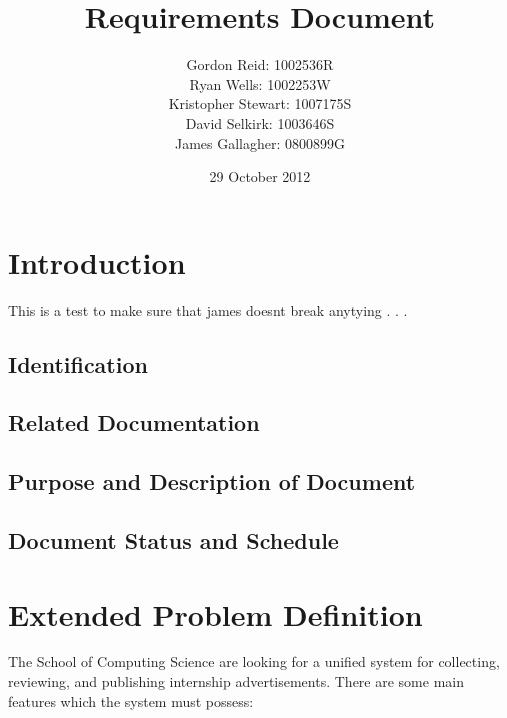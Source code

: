 \documentclass{l3deliverable}
\title{Requirements Document}
\author{
    Gordon Reid: 1002536R\\
    Ryan Wells: 1002253W\\
    Kristopher Stewart: 1007175S\\
    David Selkirk: 1003646S\\
    James Gallagher: 0800899G\\
}
\date{29 October 2012}
\begin{document}

\maketitle

\tableofcontents

\newpage


\section{Introduction}

This is a test to make sure that james doesnt break anytying . . . 

\subsection{Identification}

\subsection{Related Documentation}

\subsection{Purpose and Description of Document}

\subsection{Document Status and Schedule}


\section{Extended Problem Definition}


The School of Computing Science are looking for a unified system for 
collecting, reviewing, and publishing internship advertisements. There are 
some main features which the system must possess: 
\end{document}
